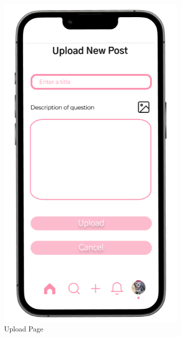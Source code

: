 \begin{figure}[h]
  \begin{subfigure}[b]{0.3\textwidth}
    \includegraphics[width=\textwidth]{Figures/upload.png}
    \caption{Upload Page}
    \label{fig:upload}
  \end{subfigure}
  \hfill
  \begin{subfigure}[b]{0.3\textwidth}

\end{subfigure}
\end{figure}
